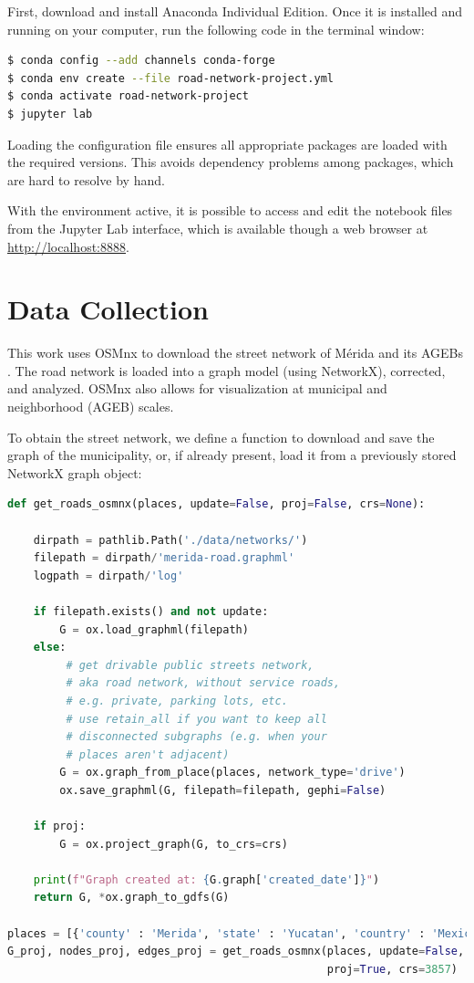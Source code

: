 First, download and install Anaconda Individual Edition. Once it is installed and running on your computer, run the following code in the terminal window:

\begin{lstlisting}[language=bash]
$ conda config --add channels conda-forge
$ conda env create --file road-network-project.yml
$ conda activate road-network-project
$ jupyter lab
\end{lstlisting}

Loading the configuration file ensures all appropriate packages are loaded with the required versions. This avoids dependency problems among packages, which are hard to resolve by hand.

With the environment active, it is possible to access and edit the notebook files from the Jupyter Lab interface, which is available though a web browser at \url{http://localhost:8888}.

\section{Data Collection}

This work uses OSMnx to download the street network of Mérida and its AGEBs . The road network is loaded into a graph model (using NetworkX), corrected, and analyzed. OSMnx also allows for visualization at municipal and neighborhood (AGEB) scales.

To obtain the street network, we define a function to download and save the graph of the municipality, or, if already present, load it from a previously stored NetworkX graph object:

\begin{lstlisting}[language=Python]
def get_roads_osmnx(places, update=False, proj=False, crs=None):

    dirpath = pathlib.Path('./data/networks/')
    filepath = dirpath/'merida-road.graphml'
    logpath = dirpath/'log'

    if filepath.exists() and not update:
        G = ox.load_graphml(filepath)
    else:
         # get drivable public streets network,
         # aka road network, without service roads,
         # e.g. private, parking lots, etc.
         # use retain_all if you want to keep all
         # disconnected subgraphs (e.g. when your
         # places aren't adjacent)
        G = ox.graph_from_place(places, network_type='drive')
        ox.save_graphml(G, filepath=filepath, gephi=False)

    if proj:
        G = ox.project_graph(G, to_crs=crs)

    print(f"Graph created at: {G.graph['created_date']}")
    return G, *ox.graph_to_gdfs(G)

places = [{'county' : 'Merida', 'state' : 'Yucatan', 'country' : 'Mexico'}]
G_proj, nodes_proj, edges_proj = get_roads_osmnx(places, update=False,
                                                 proj=True, crs=3857)
\end{lstlisting}

